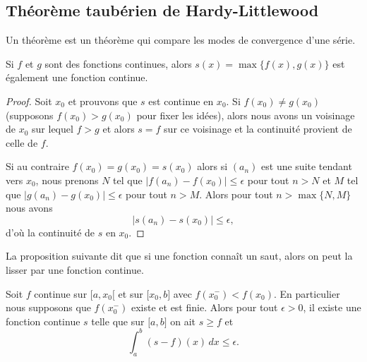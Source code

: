 \subsection{Théorème taubérien de Hardy-Littlewood}

Un théorème  est un théorème qui compare les modes de convergence d'une série.

\begin{lemma}
	Si \( f\) et \( g\) sont des fonctions continues, alors \( s(x)=\max\{ f(x),g(x) \}\) est également une fonction continue.
\end{lemma}

\begin{proof}
	Soit \( x_0\) et prouvons que \( s\) est continue en \( x_0\). Si \( f(x_0)\neq g(x_0)\) (supposons \( f(x_0)>g(x_0)\) pour fixer les idées), alors nous avons un voisinage de \( x_0\) sur lequel \( f>g\) et alors \( s=f\) sur ce voisinage et la continuité provient de celle de \( f\).

	Si au contraire \( f(x_0)=g(x_0)=s(x_0)\) alors si \( (a_n)\) est une suite tendant vers \( x_0\), nous prenons \( N\) tel que \( \big| f(a_n)-f(x_0) \big|\leq \epsilon\) pour tout \( n>N\) et \( M\) tel que \( \big| g(a_n)-g(x_0) \big|\leq \epsilon\) pour tout \( n> M\). Alors pour tout \( n>\max\{ N,M \}\) nous avons
	\begin{equation}
		\big| s(a_n)-s(x_0) \big|\leq \epsilon,
	\end{equation}
	d'où la continuité de \( s\) en \( x_0\).
\end{proof}

La proposition suivante dit que si une fonction connaît un saut, alors on peut la lisser par une fonction continue.
\begin{proposition} \label{PropTIeYVw}
	Soit \( f\) continue sur \( \mathopen[ a , x_0 [\) et sur \( \mathopen[ x_0 , b \mathclose]\) avec \( f(x_0^-)<f(x_0)\). En particulier nous supposons que \( f(x_0^-)\) existe et est finie. Alors pour tout \( \epsilon>0\), il existe une fonction continue \( s\) telle que sur \( \mathopen[ a , b \mathclose]\) on ait \( s\geq f\) et
	\begin{equation}
		\int_a^b(s-f)(x)\,dx\leq \epsilon.
	\end{equation}
\end{proposition}

